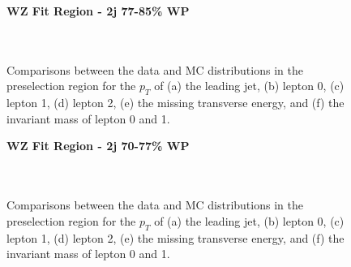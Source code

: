\begin{figure}[H]
    \centering
    \textbf{WZ Fit Region - 2j 77-85\% WP}\\
    \\
    \\
    \caption{Comparisons between the data and MC distributions in the preselection region for the $p_T$ of (a) the leading jet, (b) lepton 0, (c) lepton 1, (d) lepton 2, (e) the missing transverse energy, and (f) the invariant mass of lepton 0 and 1.}
    \label{kin:WP_2j_77_85}
\end{figure}

\begin{figure}[H]
    \centering
    \textbf{WZ Fit Region - 2j 70-77\% WP}\\
    \\
    \\
    \caption{Comparisons between the data and MC distributions in the preselection region for the $p_T$ of (a) the leading jet, (b) lepton 0, (c) lepton 1, (d) lepton 2, (e) the missing transverse energy, and (f) the invariant mass of lepton 0 and 1.}
    \label{kin:WP_2j_70_77}
\end{figure}

